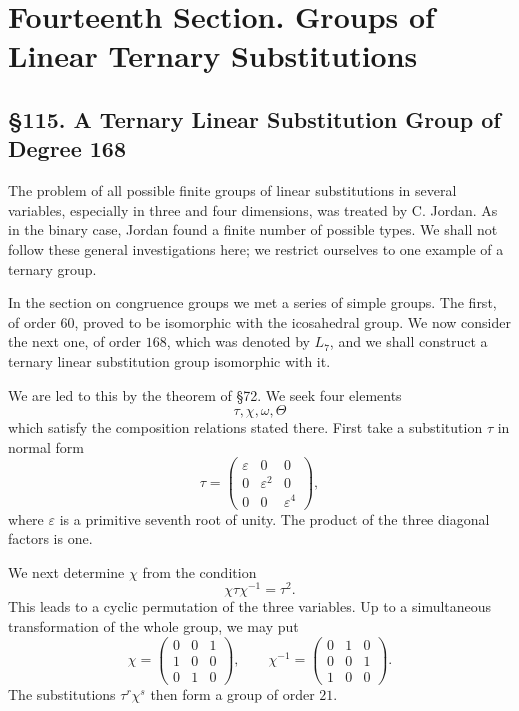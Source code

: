 \documentclass[11pt,a4paper]{book}
\newcommand{\webersection}[2]{\clearpage\section*{\S #1. #2}}
\newcommand{\booktitle}[1]{\clearpage\chapter*{#1}}
\begin{document}
\newpage
\booktitle{Fourteenth Section. Groups of Linear Ternary Substitutions}

\webersection{115}{A Ternary Linear Substitution Group of Degree 168}

The problem of all possible finite groups of linear substitutions in several variables, especially in three and four dimensions, was treated by C. Jordan.  As in the binary case, Jordan found a finite number of possible types.  We shall not follow these general investigations here; we restrict ourselves to one example of a ternary group.

In the section on congruence groups we met a series of simple groups.  The first, of order $60$, proved to be isomorphic with the icosahedral group.  We now consider the next one, of order $168$, which was denoted by $L_7$, and we shall construct a ternary linear substitution group isomorphic with it.

We are led to this by the theorem of \S 72.  We seek four elements
\[
 \tau,\chi,\omega,\Theta
\]
which satisfy the composition relations stated there.  First take a substitution $\tau$ in normal form
\begin{equation}
 \tau=\begin{pmatrix}
 \varepsilon&0&0\\
 0&\varepsilon^2&0\\
 0&0&\varepsilon^4
 \end{pmatrix},
\end{equation}
where $\varepsilon$ is a primitive seventh root of unity.  The product of the three diagonal factors is one.

We next determine $\chi$ from the condition
\begin{equation}
 \chi\tau\chi^{-1}=\tau^2.
\end{equation}
This leads to a cyclic permutation of the three variables.  Up to a simultaneous transformation of the whole group, we may put
\begin{equation}
 \chi=\begin{pmatrix}
0&0&1\\
1&0&0\\
0&1&0
\end{pmatrix},
\qquad
 \chi^{-1}=\begin{pmatrix}
0&1&0\\
0&0&1\\
1&0&0
\end{pmatrix}.
\end{equation}
The substitutions $\tau^r\chi^s$ then form a group of order $21$.
\end{document}
